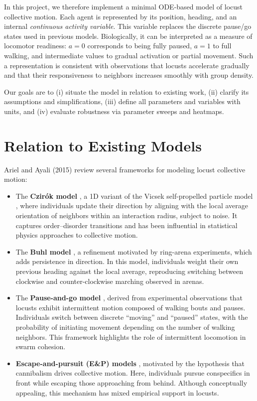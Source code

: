 \documentclass[11pt,a4paper]{article}
\begin{document}
In this project, we therefore implement a minimal ODE-based model of locust collective motion. Each agent is represented by its position, heading, and an internal \emph{continuous activity variable}. This variable replaces the discrete pause/go states used in previous models. Biologically, it can be interpreted as a measure of locomotor readiness: $a=0$ corresponds to being fully paused, $a=1$ to full walking, and intermediate values to gradual activation or partial movement. Such a representation is consistent with observations that locusts accelerate gradually and that their responsiveness to neighbors increases smoothly with group density.  

Our goals are to (i) situate the model in relation to existing work, (ii) clarify its assumptions and simplifications, (iii) define all parameters and variables with units, and (iv) evaluate robustness via parameter sweeps and heatmaps.  

\section{Relation to Existing Models}

Ariel and Ayali (2015) review several frameworks for modeling locust collective motion:

\begin{itemize}
    \item The \textbf{Czirók model} \cite{czirok1999collective}, a 1D variant of the Vicsek self-propelled particle model \cite{vicsek1995novel}, where individuals update their direction by aligning with the local average orientation of neighbors within an interaction radius, subject to noise. It captures order--disorder transitions and has been influential in statistical physics approaches to collective motion.

    \item The \textbf{Buhl model} \cite{buhl2006disorder}, a refinement motivated by ring-arena experiments, which adds persistence in direction. In this model, individuals weight their own previous heading against the local average, reproducing switching between clockwise and counter-clockwise marching observed in arenas.

    \item The \textbf{Pause-and-go model} \cite{ariel2014pausego}, derived from experimental observations that locusts exhibit intermittent motion composed of walking bouts and pauses. Individuals switch between discrete ``moving'' and ``paused'' states, with the probability of initiating movement depending on the number of walking neighbors. This framework highlights the role of intermittent locomotion in swarm cohesion.

    \item \textbf{Escape-and-pursuit (E\&P) models} \cite{romanczuk2012active}, motivated by the hypothesis that cannibalism drives collective motion. Here, individuals pursue conspecifics in front while escaping those approaching from behind. Although conceptually appealing, this mechanism has mixed empirical support in locusts.
\end{itemize}
\end{document}
